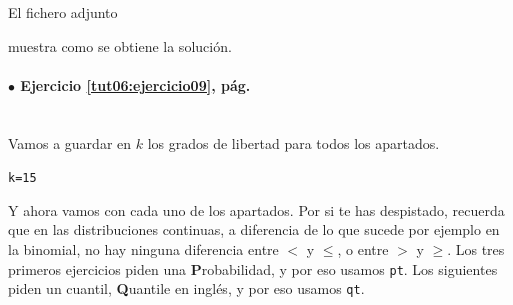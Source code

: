 \documentclass[10pt,a4paper]{article}\usepackage[]{graphicx}\usepackage[]{color}
\makeatletter
\newcommand{\hlnum}[1]{\textcolor[rgb]{0.686,0.059,0.569}{#1}}%
\newcommand{\hlstd}[1]{\textcolor[rgb]{0.345,0.345,0.345}{#1}}%
\newcommand{\hlkwb}[1]{\textcolor[rgb]{0.69,0.353,0.396}{#1}}%
\newenvironment{kframe}{%
 \def\at@end@of@kframe{}%
 \ifinner\ifhmode%
  \def\at@end@of@kframe{\end{minipage}}%
  \begin{minipage}{\columnwidth}%
 \fi\fi%
 \def\FrameCommand##1{\hskip\@totalleftmargin \hskip-\fboxsep
 \colorbox{shadecolor}{##1}\hskip-\fboxsep
     \hskip-\linewidth \hskip-\@totalleftmargin \hskip\columnwidth}%
 \MakeFramed {\advance\hsize-\width
   \@totalleftmargin\z@ \linewidth\hsize
   \@setminipage}}%
 {\par\unskip\endMakeFramed%
 \at@end@of@kframe}
\newenvironment{knitrout}{}{} %
\newcounter {cont01}
\makeatother
\begin{document}
El fichero adjunto
\begin{center}
\end{center}
muestra como se obtiene la solución.

\paragraph{\bf $\bullet$ Ejercicio \ref{tut06:ejercicio09}, pág. \pageref{tut06:ejercicio09}}
\label{tut06:ejercicio09:sol}\quad\\

Vamos a guardar en $k$ los grados de libertad para todos los apartados.
\begin{knitrout}
\color{fgcolor}\begin{kframe}
\begin{alltt}
\hlstd{k} \hlkwb{=} \hlnum{15}
\end{alltt}
\end{kframe}
\end{knitrout}
Y ahora vamos con cada uno de los apartados. Por si te has despistado, recuerda que en las distribuciones continuas, a diferencia de lo que sucede por ejemplo en la binomial, no hay ninguna diferencia entre $<$ y $\leq$, o entre $>$ y $\geq$. Los tres primeros ejercicios piden una {\bf P}robabilidad, y por eso usamos {\tt pt}. Los siguientes piden un cuantil, {\bf Q}uantile en inglés, y por eso usamos {\tt qt}.
\end{document}
